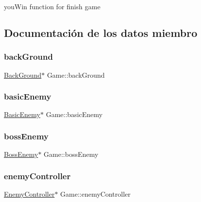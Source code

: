 you\+Win function for finish game 



\subsection{Documentación de los datos miembro}
\hypertarget{class_game_a524bd09cf01b51b835f6c574c88ed0ee}{}\label{class_game_a524bd09cf01b51b835f6c574c88ed0ee} 
\subsubsection{\texorpdfstring{back\+Ground}{backGround}}
{\footnotesize\ttfamily \hyperlink{class_back_ground}{Back\+Ground}$\ast$ Game\+::back\+Ground}

\hypertarget{class_game_a14c5877efccfde28a30d4d15f7dd68be}{}\label{class_game_a14c5877efccfde28a30d4d15f7dd68be} 
\subsubsection{\texorpdfstring{basic\+Enemy}{basicEnemy}}
{\footnotesize\ttfamily \hyperlink{class_basic_enemy}{Basic\+Enemy}$\ast$ Game\+::basic\+Enemy}

\hypertarget{class_game_a24b3b9175f68e174b9cc88c4372fee68}{}\label{class_game_a24b3b9175f68e174b9cc88c4372fee68} 
\subsubsection{\texorpdfstring{boss\+Enemy}{bossEnemy}}
{\footnotesize\ttfamily \hyperlink{class_boss_enemy}{Boss\+Enemy}$\ast$ Game\+::boss\+Enemy}

\hypertarget{class_game_a1732035088c7b0150817197895116097}{}\label{class_game_a1732035088c7b0150817197895116097} 
\subsubsection{\texorpdfstring{enemy\+Controller}{enemyController}}
{\footnotesize\ttfamily \hyperlink{class_enemy_controller}{Enemy\+Controller}$\ast$ Game\+::enemy\+Controller}

